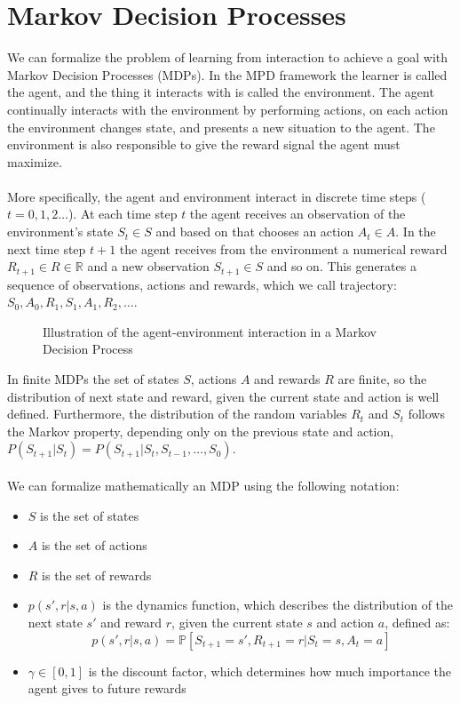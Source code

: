 \section{Markov Decision Processes}

We can formalize the problem of learning from interaction to achieve a goal with Markov Decision Processes (MDPs). In the MPD framework the learner is called the agent, and the thing it interacts with is called the environment. The agent continually interacts with the environment by performing actions, on each action the environment changes state, and presents a new situation to the agent. The environment is also responsible to give the reward signal the agent must maximize.\\\\
More specifically, the agent and environment interact in discrete time steps ($t=0, 1, 2 \dots$). At each time step $t$ the agent receives an observation of the environment's state $S_t \in S$ and based on that chooses an action $A_t \in A$. In the next time step $t+1$ the agent receives from the environment a numerical reward $R_{t+1} \in R \in \mathbb{R}$ and a new observation $S_{t+1} \in S$ and so on. This generates a sequence of observations, actions and rewards, which we call trajectory: $S_0, A_0, R_1, S_1, A_1, R_2, \dots$.
\begin{figure}[H]
    \centering
    
    \caption{Illustration of the agent-environment interaction in a Markov Decision Process}
    \label{fig:mdp}
\end{figure}
\clearpage
In finite MDPs the set of states $S$, actions $A$ and rewards $R$ are finite, so the distribution of next state and reward, given the current state and action is well defined. Furthermore, the distribution of the random variables $R_t$ and $S_t$ follows the Markov property, depending only on the previous state and action, $P(S_{t+1}|S_t) = P(S_{t+1}|S_t, S_{t-1}, \dots, S_0)$.\\\\
We can formalize mathematically an MDP using the following notation:
\begin{itemize}
    \item $S$ is the set of states
    \item $A$ is the set of actions
    \item $R$ is the set of rewards
    \item $p(s', r | s, a)$ is the dynamics function, which describes the distribution of the next state $s'$ and reward $r$, given the current state $s$ and action $a$, defined as:
    \begin{equation}
        p(s', r | s, a) = \mathds{P}[S_{t+1} = s', R_{t+1} = r | S_t = s, A_t = a]
        \label{dynamics-function}
    \end{equation}
    \item $\gamma \in [0, 1]$ is the discount factor, which determines how much importance the agent gives to future rewards
\end{itemize}

